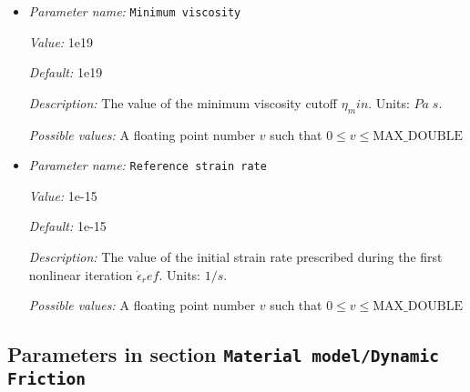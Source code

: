\begin{itemize}
{\it Possible values:} A floating point number $v$ such that $0 \leq v \leq \text{MAX\_DOUBLE}$
\item {\it Parameter name:} {\tt Minimum viscosity}
\label{parameters:Material model/Drucker Prager/Viscosity/Minimum viscosity}
\label{parameters:Material_20model/Drucker_20Prager/Viscosity/Minimum_20viscosity}


{\it Value:} 1e19


{\it Default:} 1e19


{\it Description:} The value of the minimum viscosity cutoff $\eta_min$. Units: $Pa\;s$.


{\it Possible values:} A floating point number $v$ such that $0 \leq v \leq \text{MAX\_DOUBLE}$
\item {\it Parameter name:} {\tt Reference strain rate}
\label{parameters:Material model/Drucker Prager/Viscosity/Reference strain rate}
\label{parameters:Material_20model/Drucker_20Prager/Viscosity/Reference_20strain_20rate}


{\it Value:} 1e-15


{\it Default:} 1e-15


{\it Description:} The value of the initial strain rate prescribed during the first nonlinear iteration $\dot{\epsilon}_ref$. Units: $1/s$.


{\it Possible values:} A floating point number $v$ such that $0 \leq v \leq \text{MAX\_DOUBLE}$
\end{itemize}

\subsection{Parameters in section \tt Material model/Dynamic Friction}
\label{parameters:Material_20model/Dynamic_20Friction}

